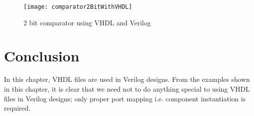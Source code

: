 
\begin{figure}[!h]
	\centering
	\texttt{[image: comparator2BitWithVHDL]}
	\caption{2 bit comparator using VHDL and Verilog}
	\label{fig:comparator2BitWithVHDL}
\end{figure}

\section{Conclusion}
In this chapter, VHDL files are used in Verilog designs. From the examples shown in this chapter, it is clear that we need not to do anything special to using VHDL files in Verilog designs; only proper port mapping i.e. component instantiation is required. 

